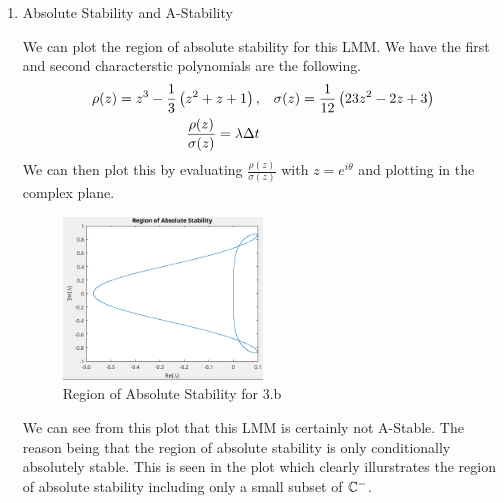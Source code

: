 \documentclass{article}
\begin{document}
\begin{enumerate}[label=\alph*)]
    \item Absolute Stability and A-Stability

    We can plot the region of absolute stability for this LMM. We have the first
    and second characterstic polynomials are the following. 
    \begin{align*}
        \rho(z) = z^3 - \frac{1}{3}\left(z^2 + z + 1\right), &\quad \sigma(z) =
        \frac{1}{12}\left(23z^2 - 2z + 3\right)\\
        \frac{\rho(z)}{\sigma(z)} = \lambda \Delta t 
    \end{align*}
    We can then plot this by evaluating $\frac{\rho(z)}{\sigma(z)}$ with
    $z=e^{i\theta}$ and plotting in the complex plane. 
    \begin{figure}[h]
        \centering 
        \includegraphics[width=0.5\textwidth]{3.b.AbsStab.png}
        \caption{Region of Absolute Stability for 3.b}
    \end{figure}
    We can see from this plot that this LMM is certainly not A-Stable. The
    reason being that the region of absolute stability is only conditionally
    absolutely stable. This is seen in the plot which clearly illurstrates the
    region of absolute stability including only a small subset of $\mathbb{C}^-$. 
    

\end{enumerate}
\end{document}
